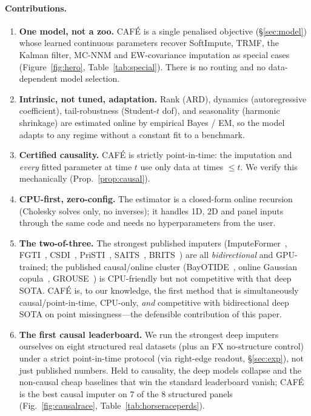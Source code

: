 \documentclass[10pt,twocolumn]{article}
\newcommand{\cafe}{CAF\'E}
\begin{document}
\paragraph{Contributions.}
\begin{enumerate}\itemsep1pt
\item \textbf{One model, not a zoo.} \cafe{} is a single penalised objective
(\S\ref{sec:model}) whose learned continuous parameters recover SoftImpute,
TRMF, the Kalman filter, MC-NNM and EW-covariance imputation as special cases
(Figure~\ref{fig:hero}, Table~\ref{tab:special}). There is no routing and no
data-dependent model selection.
\item \textbf{Intrinsic, not tuned, adaptation.} Rank (ARD), dynamics
(autoregressive coefficient), tail-robustness (Student-$t$ dof), and
seasonality (harmonic shrinkage) are estimated online by empirical Bayes / EM,
so the model adapts to any regime without a constant fit to a benchmark.
\item \textbf{Certified causality.} \cafe{} is strictly point-in-time: the
imputation and \emph{every} fitted parameter at time $t$ use only data at times
$\le t$. We verify this mechanically (Prop.~\ref{prop:causal}).
\item \textbf{CPU-first, zero-config.} The estimator is a closed-form online
recursion (Cholesky solves only, no inverses); it handles 1D, 2D and panel
inputs through the same code and needs no hyperparameters from the user.
\item \textbf{The two-of-three.} The strongest published imputers
(ImputeFormer~\cite{nie2024imputeformer}, FGTI~\cite{fgti2024},
CSDI~\cite{tashiro2021}, PriSTI~\cite{liu2023pristi}, SAITS~\cite{du2023},
BRITS~\cite{cao2018}) are all \emph{bidirectional} and GPU-trained; the published
causal/online cluster (BayOTIDE~\cite{fang2024bayotide}, online Gaussian
copula~\cite{zhao2022copula}, GROUSE~\cite{balzano2010grouse}) is CPU-friendly
but not competitive with that deep SOTA. \cafe{} is, to our knowledge, the first
method that is simultaneously causal/point-in-time, CPU-only, \emph{and}
competitive with bidirectional deep SOTA on point missingness---the defensible
contribution of this paper.
\item \textbf{The first causal leaderboard.} We run the strongest deep imputers
ourselves on eight structured real datasets (plus an FX no-structure control)
under a strict point-in-time protocol (via right-edge readout, \S\ref{sec:exp}),
not just published numbers. Held to causality, the deep models collapse and the
non-causal cheap baselines that win the standard leaderboard vanish; \cafe{} is the
best causal imputer on $7$ of the $8$ structured panels (Fig.~\ref{fig:causalrace},
Table~\ref{tab:horseraceperds}).
\end{enumerate}
\end{document}
